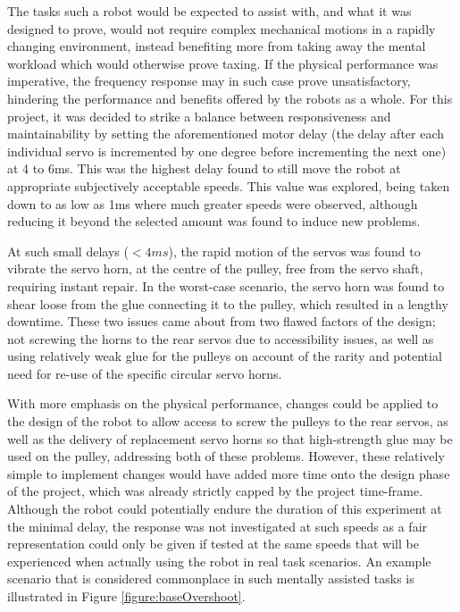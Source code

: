 \documentclass[11pt]{article}
\begin{document}
The tasks such a robot would be expected to assist with, and what it was designed to prove, would not require complex mechanical motions in a rapidly changing environment, instead benefiting more from taking away the mental workload which would otherwise prove taxing. If the physical performance was imperative, the frequency response may in such case prove unsatisfactory, hindering the performance and benefits offered by the robots as a whole. For this project, it was decided to strike a balance between responsiveness and maintainability by setting the aforementioned motor delay (the delay after each individual servo is incremented by one degree before incrementing the next one) at 4 to 6ms. This was the highest delay found to still move the robot at appropriate subjectively acceptable speeds. This value was explored, being taken down to as low as 1ms where much greater speeds were observed, although reducing it beyond the selected amount was found to induce new problems. 

At such small delays ($<4ms$), the rapid motion of the servos was found to vibrate the servo horn, at the centre of the pulley, free from the servo shaft, requiring instant repair. In the worst-case scenario, the servo horn was found to shear loose from the glue connecting it to the pulley, which resulted in a lengthy downtime. These two issues came about from two flawed factors of the design; not screwing the horns to the rear servos due to accessibility issues, as well as using relatively weak glue for the pulleys on account of the rarity and potential need for re-use of the specific circular servo horns.  

With more emphasis on the physical performance, changes could be applied to the design of the robot to allow access to screw the pulleys to the rear servos, as well as the delivery of replacement servo horns so that high-strength glue may be used on the pulley, addressing both of these problems. However, these relatively simple to implement changes would have added more time onto the design phase of the project, which was already strictly capped by the project time-frame. Although the robot could potentially endure the duration of this experiment at the minimal delay, the response was not investigated at such speeds as a fair representation could only be given if tested at the same speeds that will be experienced when actually using the robot in real task scenarios. An example scenario that is considered commonplace in such mentally assisted tasks is illustrated in Figure \ref{figure:baseOvershoot}.
\end{document}
